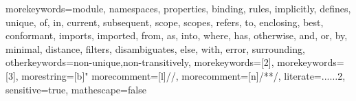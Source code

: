  {
  morekeywords={module, namespaces, properties, binding, rules, implicitly, defines, unique, of, in, current, subsequent, scope, scopes, refers, to, enclosing, best, conformant, imports, imported, from, as, into, where, has, otherwise, and, or, by, minimal, distance, filters, disambiguates, else, with, error, surrounding},
  otherkeywords={non-unique,non-transitively},
  morekeywords=[2]{}, %
  morekeywords=[3]{}, %
  morestring=[b]"
	morecomment=[l]{//},
	morecomment=[n]{/*}{*/},
  literate={...}{$\ldots$}2,
  sensitive=true,
  mathescape=false
}

\newcommand{\nablcode}[1]{\lstinline[language=NaBL,basicstyle=\lstinlinestyle,breaklines=false]{#1}}
\newcommand{\nablcodebl}[1]{\lstinline[language=NaBL,basicstyle=\lstinlinestyle,breaklines=true]{#1}}
\newcommand{\NaBL}{\langname{NaBL}}
